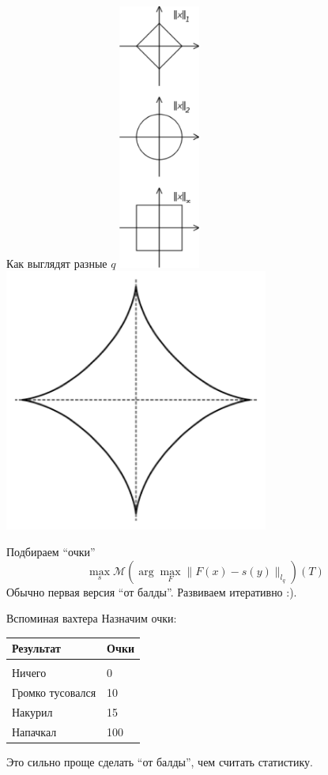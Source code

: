 \documentclass[14pt, fleqn, xcolor={dvipsnames, table}]{beamer}
\begin{document}
\begin{frame}{Как выглядят разные $q$}
\centering
\includegraphics[width=0.2\textwidth]{lq1.png}\includegraphics[width=0.65\textwidth]{lq2.png}
\end{frame}

\begin{frame}{Подбираем ``очки''} %
$$
\max_{s} \mathcal{M} \left(\arg\max_{F} \|F(x) - s(y)\|_{l_q}\right)(T)
$$
Обычно первая версия ``от балды''. Развиваем итеративно :).
\end{frame}

\begin{frame}{Вспоминая вахтера}
Назначим очки:

\begin{tabular}{p{}|l}
Результат & Очки \\
\hline \\
Ничего & 0 \\
Громко тусовался & 10 \\
Накурил & 15 \\
Напачкал & 100 \\
\end{tabular}

Это сильно проще сделать ``от балды'', чем считать статистику.
\end{frame}
\end{document}
